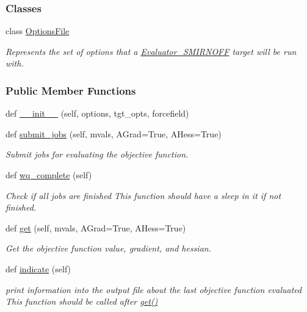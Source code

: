 \subsubsection*{Classes}
\begin{DoxyCompactItemize}
\item 
class \hyperlink{classsrc_1_1evaluator__io_1_1Evaluator__SMIRNOFF_1_1OptionsFile}{Options\+File}
\begin{DoxyCompactList}\small\item\em Represents the set of options that a {\ttfamily \hyperlink{classsrc_1_1evaluator__io_1_1Evaluator__SMIRNOFF}{Evaluator\+\_\+\+S\+M\+I\+R\+N\+O\+FF}} target will be run with. \end{DoxyCompactList}\end{DoxyCompactItemize}
\subsubsection*{Public Member Functions}
\begin{DoxyCompactItemize}
\item 
def \hyperlink{classsrc_1_1evaluator__io_1_1Evaluator__SMIRNOFF_a97531ba6b45131f7940470ed0143e45a}{\+\_\+\+\_\+init\+\_\+\+\_\+} (self, options, tgt\+\_\+opts, forcefield)
\item 
def \hyperlink{classsrc_1_1evaluator__io_1_1Evaluator__SMIRNOFF_a27d6f29563811786b154b4c37d2ee845}{submit\+\_\+jobs} (self, mvals, A\+Grad=True, A\+Hess=True)
\begin{DoxyCompactList}\small\item\em Submit jobs for evaluating the objective function. \end{DoxyCompactList}\item 
def \hyperlink{classsrc_1_1evaluator__io_1_1Evaluator__SMIRNOFF_a111e3b1112012349ffbb658f68a970bd}{wq\+\_\+complete} (self)
\begin{DoxyCompactList}\small\item\em Check if all jobs are finished This function should have a sleep in it if not finished. \end{DoxyCompactList}\item 
def \hyperlink{classsrc_1_1evaluator__io_1_1Evaluator__SMIRNOFF_a609eeee4162c7b26fa40ff0df3eff104}{get} (self, mvals, A\+Grad=True, A\+Hess=True)
\begin{DoxyCompactList}\small\item\em Get the objective function value, gradient, and hessian. \end{DoxyCompactList}\item 
def \hyperlink{classsrc_1_1evaluator__io_1_1Evaluator__SMIRNOFF_ac09d0d592c217a77684c8a20e8ae8cef}{indicate} (self)
\begin{DoxyCompactList}\small\item\em print information into the output file about the last objective function evaluated This function should be called after \hyperlink{classsrc_1_1evaluator__io_1_1Evaluator__SMIRNOFF_a609eeee4162c7b26fa40ff0df3eff104}{get()} \end{DoxyCompactList}\end{DoxyCompactItemize}



